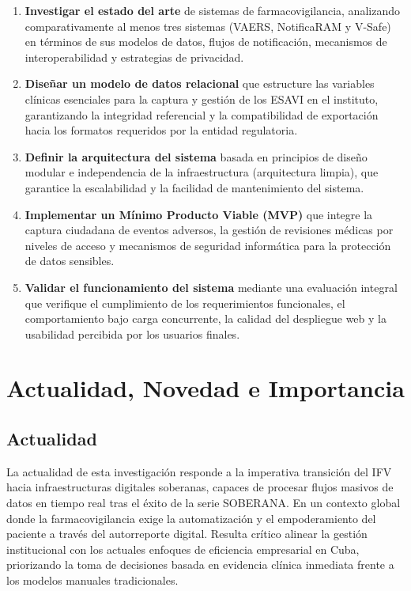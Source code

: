 \begin{enumerate}
    \item \textbf{Investigar el estado del arte} de sistemas de farmacovigilancia, analizando comparativamente al menos tres sistemas (VAERS, NotificaRAM y V-Safe) en términos de sus modelos de datos, flujos de notificación, mecanismos de interoperabilidad y estrategias de privacidad.
    
    \item \textbf{Diseñar un modelo de datos relacional} que estructure las variables clínicas esenciales para la captura y gestión de los ESAVI en el instituto, garantizando la integridad referencial y la compatibilidad de exportación hacia los formatos requeridos por la entidad regulatoria.
    
    \item \textbf{Definir la arquitectura del sistema} basada en principios de diseño modular e independencia de la infraestructura (arquitectura limpia), que garantice la escalabilidad y la facilidad de mantenimiento del sistema.
    
    \item \textbf{Implementar un Mínimo Producto Viable (MVP)} que integre la captura ciudadana de eventos adversos, la gestión de revisiones médicas por niveles de acceso y mecanismos de seguridad informática para la protección de datos sensibles.
    
    \item \textbf{Validar el funcionamiento del sistema} mediante una evaluación integral que verifique el cumplimiento de los requerimientos funcionales, el comportamiento bajo carga concurrente, la calidad del despliegue web y la usabilidad percibida por los usuarios finales.
    
\end{enumerate}



\section{Actualidad, Novedad e Importancia}\label{section:actualidadNovedadImportancia}


\subsection{Actualidad}


La actualidad de esta investigación responde a la imperativa transición del IFV hacia infraestructuras digitales soberanas, capaces de procesar flujos masivos de datos en tiempo real tras el éxito de la serie SOBERANA. 
En un contexto global donde la farmacovigilancia exige la automatización y el empoderamiento del paciente a través del autorreporte digital.
Resulta crítico alinear la gestión institucional con los actuales enfoques de eficiencia empresarial en Cuba, priorizando la toma de decisiones basada en evidencia clínica inmediata frente a los modelos manuales tradicionales.

